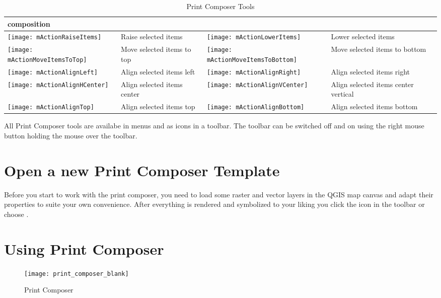 \begin{table}[h]
\begin{tabular}{|m{1cm}|m{5.4cm}|m{1cm}|m{5.4cm}|}
 composition \\
 \hline \texttt{[image: mActionRaiseItems]} & Raise selected
 items  &
 \texttt{[image: mActionLowerItems]} & Lower selected items \\
 \hline \texttt{[image: mActionMoveItemsToTop]} & Move selected
 items to top &
 \texttt{[image: mActionMoveItemsToBottom]} & Move selected
 items to bottom \\
 \hline \texttt{[image: mActionAlignLeft]} & Align selected
 items left &
 \texttt{[image: mActionAlignRight]} & Align selected items
 right \\
 \hline \texttt{[image: mActionAlignHCenter]} & Align selected
 items center &
 \texttt{[image: mActionAlignVCenter]} & Align selected items
 center vertical \\
 \hline \texttt{[image: mActionAlignTop]} & Align selected
 items top &
 \texttt{[image: mActionAlignBottom]} & Align selected
 items bottom \\
\hline
\end{tabular}
\caption{Print Composer Tools}\label{tab:printcomposer_tools}
\end{table}

All Print Composer tools are availabe in menus and as icons in a toolbar. The
toolbar can be switched off and on using the right mouse button holding the
mouse over the toolbar.

\section{Open a new Print Composer Template}\label{composertemplates}

Before you start to work with the print composer, you need to load some
raster and vector layers in the QGIS map canvas and adapt their properties
to suite your own convenience. After everything is rendered and symbolized to
your liking you click the 
icon in the toolbar or choose  \arrow
{}.

\section{Using Print Composer}\label{label_useprintcomposer}

\begin{figure}[ht]
   \centering
   \texttt{[image: print\_composer\_blank]}
   \caption{Print Composer \nixcaption}\label{fig:print_composer_blank}
\end{figure}

